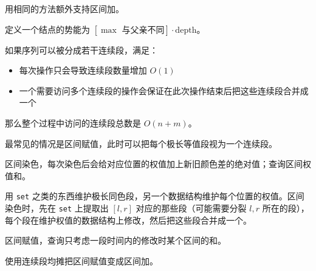 
\begin{example}
    用相同的方法额外支持区间加。
\end{example}
\begin{solution}
    定义一个结点的势能为 $[\max\text{ 与父亲不同}]\cdot \mathrm{depth}$。
\end{solution}

\begin{example}
    如果序列可以被分成若干连续段，满足：
    \begin{itemize}
        \item 每次操作只会导致连续段数量增加 $O(1)$
        \item 一个需要访问多个连续段的操作会保证在此次操作结束后把这些连续段合并成一个
    \end{itemize}
    那么整个过程中访问的连续段总数是 $O(n+m)$。
\end{example}
\begin{remark}
    最常见的情况是区间赋值，此时可以把每个极长等值段视为一个连续段。
\end{remark}
\begin{example}[CF444C]
    区间染色，每次染色后会给对应位置的权值加上新旧颜色差的绝对值；查询区间权值和。
\end{example}
\begin{solution}
    用 \texttt{set} 之类的东西维护极长同色段，另一个数据结构维护每个位置的权值。区间染色时，先在 \texttt{set} 上提取出 $[l,r]$ 对应的那些段（可能需要分裂 $l,r$ 所在的段），每个段在维护权值的数据结构上修改，然后把这些段合并成一个。
\end{solution}
\begin{example}[P8512]
    区间赋值，查询只考虑一段时间内的修改时某个区间的和。
\end{example}
\begin{solution}
    使用连续段均摊把区间赋值变成区间加。
    

\end{solution}

